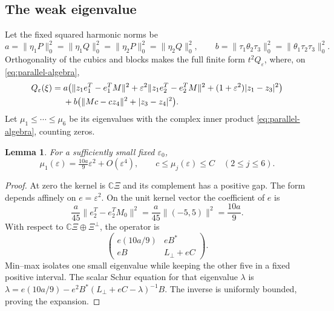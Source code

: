 \documentclass[11pt]{amsart}
\newtheorem{lemma}[theorem]{Lemma}
\theoremstyle{definition}
\theoremstyle{remark}
\newcommand{\CC}{\mathbb C}
\begin{document}
\subsection{The weak eigenvalue}
Let the fixed squared harmonic norms be
\[
 a=\|\eta_1P\|_0^2=\|\eta_1Q\|_0^2
  =\|\eta_2P\|_0^2=\|\eta_2Q\|_0^2,\qquad
 b=\|\tau_1\theta_2\tau_3\|_0^2
  =\|\theta_1\tau_2\tau_3\|_0^2.
\]
Orthogonality of the cubics and blocks makes the full finite form
$t^2Q_\varepsilon$, where, on \eqref{eq:parallel-algebra},
\begin{align}
 Q_\varepsilon(\xi)={}&a\bigl(
 \|z_1e_1^T-e_1^TM\|^2+
 \varepsilon^2\|z_1e_2^T-e_2^TM\|^2+
 (1+\varepsilon^2)|z_1-z_3|^2\bigr)\notag\\
 &+b\bigl(\|Mc-cz_4\|^2+|z_3-z_4|^2\bigr).
 \label{eq:fixed-finite-form}
\end{align}
Let $\mu_1\le\cdots\le\mu_6$ be its eigenvalues with the
complex inner product \eqref{eq:parallel-algebra}, counting zeros.

\begin{lemma}\label{lem:fixed-weak}
For a sufficiently small fixed $\varepsilon_0$,
\[
 \mu_1(\varepsilon)=\tfrac{10a}{9}\varepsilon^2+O(\varepsilon^4),
 \qquad c\le\mu_j(\varepsilon)\le C\quad(2\le j\le6).
\]
\end{lemma}
\begin{proof}
At zero the kernel is $\CC\Xi$ and its complement has a positive
gap. The form depends affinely on $e=\varepsilon^2$. On the unit
kernel vector the coefficient of $e$ is
\[
 \frac a{45}\|e_2^T-e_2^TM_0\|^2
 =\frac a{45}\|(-5,5)\|^2=\frac{10a}{9}.
\]
With respect to $\CC\Xi\oplus\Xi^\perp$, the operator is
\[
 \begin{pmatrix}e(10a/9)&eB^*\\eB&L_\perp+eC\end{pmatrix}.
\]
Min--max isolates one small eigenvalue while keeping the other five
in a fixed positive interval. The scalar Schur equation for that
eigenvalue $\lambda$ is
$\lambda=e(10a/9)-e^2B^*(L_\perp+eC-\lambda)^{-1}B$.
The inverse is uniformly bounded, proving the expansion.
\end{proof}
\end{document}
